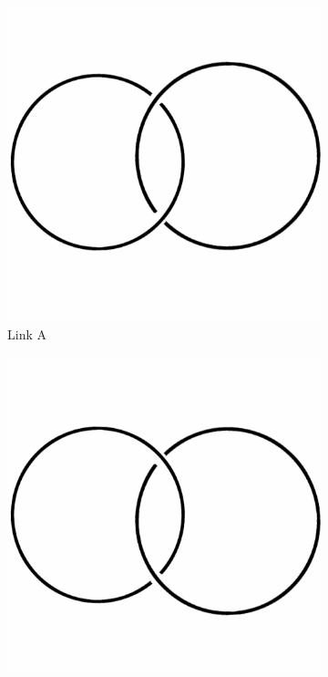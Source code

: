 \documentclass[12pt,letterpaper]{article}
\theoremstyle{definition}
\begin{document}
\begin{figure}[h]
    \centering
    \begin{subfigure}{.3\textwidth}
        \centering
        \includegraphics[width=\textwidth]{knotpics/hopf.png}
        \caption{Link A}
    \end{subfigure}
    \quad
    \begin{subfigure}{.3\textwidth}
        \centering
        \includegraphics[width=\textwidth]{knotpics/hopfmirror.png}

\end{subfigure}
\end{figure}
\end{document}
